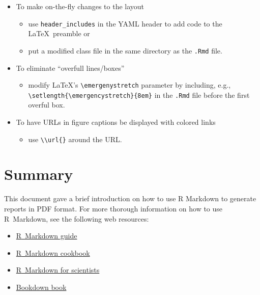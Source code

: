 \documentclass{article}
\begin{document}
\begin{itemize}
\tightlist
\item
  To make on-the-fly changes to the layout

  \begin{itemize}
  \tightlist
  \item
    use \texttt{header\_includes} in the YAML header to add code to the \LaTeX~preamble or
  \item
    put a modified class file in the same directory as the \texttt{.Rmd} file.
  \end{itemize}
\item
  To eliminate ``overfull lines/boxes''

  \begin{itemize}
  \tightlist
  \item
    modify \LaTeX's \texttt{\textbackslash{}emergenystretch} parameter by including, e.g., \texttt{\textbackslash{}setlength\{\textbackslash{}emergencystretch\}\{8em\}} in the \texttt{.Rmd} file before the first overful box.
  \end{itemize}
\item
  To have URLs in figure captions be displayed with colored links

  \begin{itemize}
  \tightlist
  \item
    use \texttt{\textbackslash{}\textbackslash{}url\{\}} around the URL.
  \end{itemize}
\end{itemize}

\hypertarget{summary}{%
\section{Summary}\label{summary}}

This document gave a brief introduction on how to use R Markdown to generate reports in PDF format. For more thorough information on how to use \textsf{R}~Markdown, see the following web resources:

\begin{itemize}
\tightlist
\item
  \href{https://bookdown.org/yihui/rmarkdown/}{\textsf{R}~Markdown guide}
\item
  \href{https://bookdown.org/yihui/rmarkdown-cookbook/}{\textsf{R}~Markdown cookbook}
\item
  \href{https://rmd4sci.njtierney.com/}{\textsf{R}~Markdown for scientists}
\item
  \href{https://bookdown.org/yihui/bookdown/}{Bookdown book}
\end{itemize}
\end{document}
